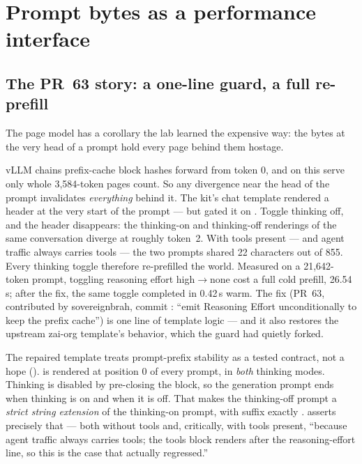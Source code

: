 \section{Prompt bytes as a performance interface}
\label{sec:proof-pr63}

\subsection{The PR~63 story: a one-line guard, a full re-prefill}

The page model has a corollary the lab learned the expensive way: the bytes
at the very head of a prompt hold every page behind them hostage.

\begin{hbwarstory}
vLLM chains prefix-cache block hashes forward from token 0, and on this serve
only whole 3{,}584-token pages count. So any divergence near the head of the
prompt invalidates \emph{everything} behind it. The kit's chat template
rendered a  header at the very start of
the prompt --- but gated it on . Toggle thinking off,
and the header disappears: the thinking-on and thinking-off renderings of the
same conversation diverge at roughly token~2. With tools present --- and agent
traffic always carries tools --- the two prompts shared 22 characters out of
855. Every thinking toggle therefore re-prefilled the world. Measured on a
21{,}642-token prompt, toggling reasoning effort high$\to$none cost a full
cold prefill, 26.54\,s; after the fix, the same toggle completed in
0.42\,s warm. The fix (PR~63, contributed by sovereignbrah, commit
: ``emit Reasoning Effort unconditionally to keep the prefix
cache'') is one line of template logic --- and it also restores the upstream
zai-org template's behavior, which the guard had quietly forked.
\end{hbwarstory}

The repaired template treats prompt-prefix stability as a tested contract, not
a hope (). 
is rendered at position 0 of every prompt, in \emph{both} thinking modes.
Thinking is disabled by pre-closing the block, so the generation prompt ends
 when thinking is on and
 when it is off. That makes the
thinking-off prompt a \emph{strict string extension} of the thinking-on
prompt, with suffix exactly .
 asserts precisely that --- both without
tools and, critically, with tools present, ``because agent traffic always
carries tools; the tools block renders after the reasoning-effort line, so
this is the case that actually regressed.''

